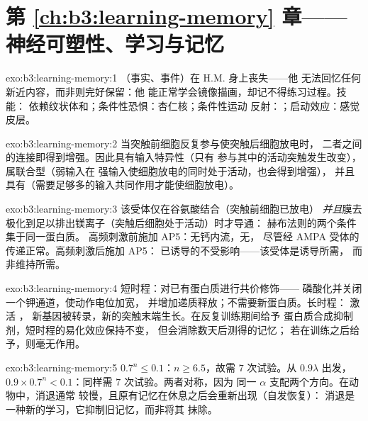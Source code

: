 \section*{第 \ref{ch:b3:learning-memory} 章——神经可塑性、学习与记忆}

\begin{solution}{exo:b3:learning-memory:1}
（事实、事件）在 H.M. 身上丧失——他
无法回忆任何新近内容，而非则完好保留：他
能正常学会镜像描画，却记不得练习过程。技能：
依赖纹状体和；条件性恐惧：杏仁核；条件性运动
反射：；启动效应：感觉皮层。
\end{solution}

\begin{solution}{exo:b3:learning-memory:2}
当突触前细胞反复参与使突触后细胞放电时，
二者之间的连接即得到增强。因此具有输入特异性（只有
参与其中的活动突触发生改变），属联合型（弱输入在
强输入使细胞放电的同时处于活动，也会得到增强），
并且具有（需要足够多的输入共同作用才能使细胞放电）。
\end{solution}

\begin{solution}{exo:b3:learning-memory:3}
该受体仅在谷氨酸结合（突触前细胞已放电）
\emph{并且}膜去极化到足以排出镁离子（突触后细胞处于活动）时才导通：
赫布法则的两个条件集于同一蛋白质。
高频刺激前施加 AP5：无钙内流，无，
尽管经 AMPA 受体的传递正常。高频刺激后施加 AP5：
已诱导的不受影响——该受体是诱导所需，
而非维持所需。
\end{solution}

\begin{solution}{exo:b3:learning-memory:4}
短时程：对已有蛋白质进行共价修饰——
磷酸化并关闭一个钾通道，使动作电位加宽，
并增加递质释放；不需要新蛋白质。长时程： 激活 ，
新基因被转录，新的突触末端生长。在反复训练期间给予
蛋白质合成抑制剂，短时程的易化效应保持不变，
但会消除数天后测得的记忆；
若在训练之后给予，则毫无作用。
\end{solution}

\begin{solution}{exo:b3:learning-memory:5}
$0.7^{n} \le 0.1$：$n \ge 6.5$，故需 $7$ 次试验。从 $0.9\lambda$ 出发，
$0.9\times 0.7^{n} < 0.1$：同样需 $7$ 次试验。两者对称，因为
同一 $\alpha$ 支配两个方向。在动物中，消退通常
较慢，且原有记忆在休息之后会重新出现（自发恢复）：
消退是一种新的学习，它抑制旧记忆，而非将其
抹除。
\end{solution}

